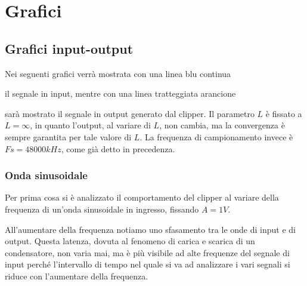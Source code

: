 	\section{Grafici}
		\subsection{Grafici input-output}
			\label{graphs:input-output}
			Nei seguenti grafici verrà mostrata con una linea blu continua
			il segnale in \textcolor{matlab_blue}{input}, mentre con una linea tratteggiata arancione
			sarà mostrato il segnale in \textcolor{matlab_orange}{output} generato dal clipper. Il parametro $L$ è fissato a $L = \infty$, in quanto l'output, al variare di $L$, non cambia, ma la convergenza è sempre garantita per tale valore di $L$. La frequenza di campionamento invece è $Fs = 48000kHz$, come già detto in precedenza.\\
		
			\subsubsection{Onda sinusoidale}
				Per prima cosa si è analizzato il comportamento del clipper al variare della frequenza di un'onda sinusoidale in ingresso, fissando $A = 1V$.
				\graficospace
				\graficospace
				\graficospace
				\graficospace
				\graficospace
				
				All'aumentare della frequenza notiamo uno sfasamento tra le onde di input e di output. Questa latenza, dovuta al fenomeno di carica e scarica di un condensatore, non varia mai, ma è più visibile ad alte frequenze del segnale di input perché l'intervallo di tempo nel quale si va ad analizzare i vari segnali si riduce con l'aumentare della frequenza.
				
